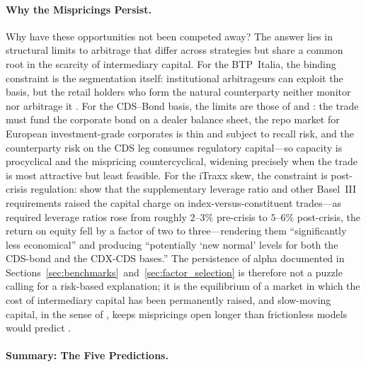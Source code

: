 \paragraph{Why the Mispricings Persist.}

Why have these opportunities not been competed away? The answer lies in
structural limits to arbitrage that differ across strategies but share
a common root in the scarcity of intermediary capital. For the
BTP~Italia, the binding constraint is the segmentation itself:
institutional arbitrageurs can exploit the basis, but the retail
holders who form the natural counterparty neither monitor nor arbitrage
it \citep{vayanos2021preferred}. For the CDS--Bond basis, the limits
are those of \citet{bai2019cds} and \citet{mitchell2012arbitrage}: the
trade must fund the corporate bond on a dealer balance sheet, the repo
market for European investment-grade corporates is thin and subject to
recall risk, and the counterparty risk on the CDS leg consumes
regulatory capital---so capacity is procyclical and the mispricing
countercyclical, widening precisely when the trade is most attractive
but least feasible. For the iTraxx skew, the constraint is post-crisis
regulation: \citet{boyarchenko2016trends} show that the supplementary
leverage ratio and other Basel~III requirements raised the capital
charge on index-versus-constituent trades---as required leverage ratios
rose from roughly $2$--$3\%$ pre-crisis to $5$--$6\%$ post-crisis, the
return on equity fell by a factor of two to three---rendering them
``significantly less economical'' and producing ``potentially `new
normal' levels for both the CDS-bond and the CDX-CDS bases.'' The
persistence of alpha documented in
Sections~\ref{sec:benchmarks}~and~\ref{sec:factor_selection} is
therefore not a puzzle calling for a risk-based explanation; it is the
equilibrium of a market in which the cost of intermediary capital has
been permanently raised, and slow-moving capital, in the sense of
\citet{duffie2010presidential}, keeps mispricings open longer than
frictionless models would predict \citep{mitchell2007slow}.

\paragraph{Summary: The Five Predictions.}

